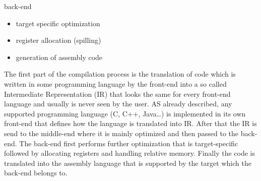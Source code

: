 \begin{myexampleblock}{back-end}
	\begin{itemize}
		\item target specific optimization
		\item register allocation (spilling)
		\item generation of assembly code
	\end{itemize}
\end{myexampleblock}
\vspace{\baselineskip}
The first part of the compilation process is the translation of code which is written in some programming language by the front-end into a so called Intermediate Representation (IR) that looks the same for every front-end language and usually is never seen by the user. AS already described, any supported programming language (C, C++, Java…) is implemented in its own front-end that defines how the language is translated into IR. After that the IR is send to the middle-end where it is mainly optimized and then passed to the back-end. The back-end first performs further optimization that is target-specific followed by allocating registers and handling relative memory. Finally the code is translated into the assembly language that is supported by the target which the back-end belongs to.
